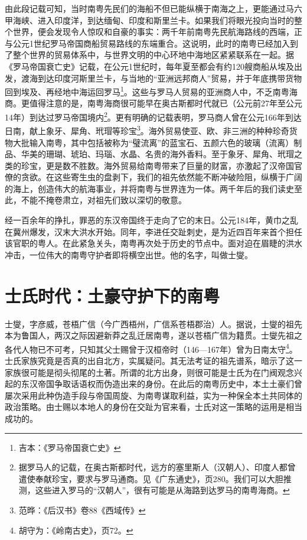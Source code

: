 由此段记载可知，当时南粤先民们的海船不但已能纵横于南海之上，更能通过马六甲海峡、进入印度洋，到达缅甸、印度和斯里兰卡。如果我们将眼光投向当时的整个世界，便会发现令人惊叹和自豪的事实：两千年前南粤先民航海路线的西端，正与公元1世纪罗马帝国商船贸易路线的东端重合。这说明，此时的南粤已经加入到了整个世界的贸易体系中，与世界文明的中心环地中海地区紧紧联系在一起。据《罗马帝国衰亡史》记载，在公元1世纪时，每年夏至都会有约120艘商船从埃及出发，渡海到达印度河斯里兰卡，与当地的“亚洲远邦商人”贸易，并于年底携带货物回到埃及、再经地中海运回罗马\footnote{吉本：《罗马帝国衰亡史》}。这些与罗马人贸易的亚洲商人中，不乏南粤海商。更值得注意的是，南粤海商很可能早在奥古斯都时代就已（公元前27年至公元14年）到达过罗马帝国境内\footnote{据罗马人的记载，在奥古斯都时代，远方的塞里斯人（汉朝人）、印度人都曾遣使奉献珍宝，要求与罗马通商。见《广东通史》，页280。我们可以大胆推测，这些进入罗马的“汉朝人”，很有可能是从海路到达罗马的南粤海商。}。更有明确的记载表明，罗马商人曾在公元166年到达日南，献上象牙、犀角、玳瑁等珍宝\footnote{范晔：《后汉书》卷88《西域传》}。海外贸易使亚、欧、非三洲的种种珍奇货物大批输入南粤，其中包括被称为“璧流离”的蓝宝石、五颜六色的玻璃（流离）制品、华美的珊瑚、琥珀、玛瑙、水晶、名贵的海外香料。至于象牙、犀角、玳瑁之类的珍宝，更是数不胜数。海外贸易给南粤带来了巨量的财富，亦激起了汉帝国官僚的贪欲。在这些寄生虫的盘剥下，我们的祖先依然能不断冲破险阻，纵横于广阔的海上，创造伟大的航海事业，并将南粤与世界连为一体。两千年后的我们读史至此，不能不掩卷肃立，对祖先们致以深切的敬意。

经一百余年的挣扎，罪恶的东汉帝国终于走向了它的末日。公元184年，黄巾之乱在冀州爆发，汉末大洪水开始。同年，李进任交趾刺史，是为近四百年来首个担任该官职的粤人。在此紧急关头，南粤再次处于历史的节点中。面对迫在眉睫的洪水冲击，一位伟大的南粤守护者即将横空出世。他的名字，叫做士燮。

\section{士氏时代：土豪守护下的南粤}

士燮，字彦威，苍梧广信（今广西梧州，广信系苍梧郡治）人。据说，士燮的祖先本为鲁国人，两汉之际因避新莽之乱迁居南粤，遂以苍梧广信为籍贯。士燮先祖之各代人物已不可考，只知其父士赐曾于汉桓帝时（146—167年）曾为日南太守\footnote{胡守为：《岭南古史》，页72。}。士氏家族究竟是否真的出自北方，实属疑问。其无法考证的祖先谱系，暗示了这一家族很可能是彻头彻尾的土著。所谓的北方出身，则很可能是士氏为在门阀观念兴起的东汉帝国争取话语权而伪造出来的身份。在此后的南粤历史中，本土土豪们曾屡次采用此种伪造手段与帝国周旋、为南粤谋取利益，实为一种保全本土共同体的政治策略。由士赐以本地人的身份在交趾为官来看，士氏对这一策略的运用是相当成功的。

